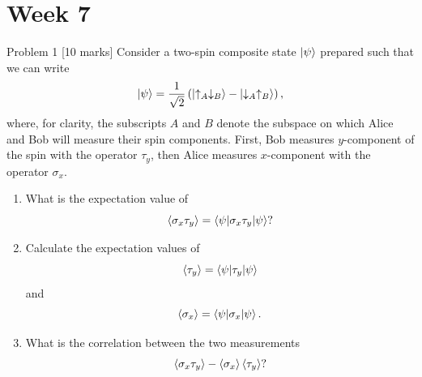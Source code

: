 \documentclass[12pt]{article}
\begin{document}
\section{Week 7}

\begin{problembox}{Problem 1 \hfill [10 marks]}
Consider a two-spin composite state $\ket{\psi}$ prepared such that we can write
\[
\ket{\psi}=\frac{1}{\sqrt{2}}
\left(\ket{\uparrow_A\downarrow_B}-\ket{\downarrow_A\uparrow_B}\right),
\]
where, for clarity, the subscripts $A$ and $B$ denote the subspace on which Alice and Bob will measure their spin components. First, Bob measures $y$-component of the spin with the operator $\tau_y$, then Alice measures $x$-component with the operator $\sigma_x$.

\begin{enumerate}
    \item What is the expectation value of
    \[
    \braket{\sigma_x\tau_y}=\braket{\psi|\sigma_x\tau_y|\psi}?
    \]
    \item Calculate the expectation values of
    \[
    \braket{\tau_y}=\braket{\psi|\tau_y|\psi}
    \]
    and
    \[
    \braket{\sigma_x}=\braket{\psi|\sigma_x|\psi}.
    \]
    \item What is the correlation between the two measurements
    \[
    \braket{\sigma_x\tau_y}-\braket{\sigma_x}\braket{\tau_y}?
    \]
\end{enumerate}
\end{problembox}
\end{document}
